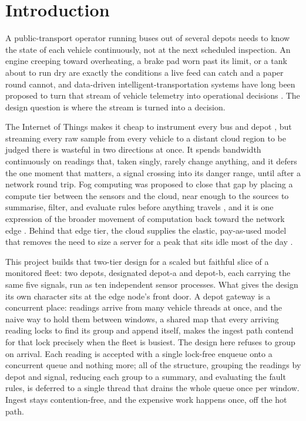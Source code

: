 \documentclass[conference]{IEEEtran}
\begin{document}
\section{Introduction}

A public-transport operator running buses out of several depots needs to know the state of each vehicle continuously, not at the next scheduled inspection. An engine creeping toward overheating, a brake pad worn past its limit, or a tank about to run dry are exactly the conditions a live feed can catch and a paper round cannot, and data-driven intelligent-transportation systems have long been proposed to turn that stream of vehicle telemetry into operational decisions \cite{zhang2011, killeen2019}. The design question is where the stream is turned into a decision.

The Internet of Things makes it cheap to instrument every bus and depot \cite{atzori2010}, but streaming every raw sample from every vehicle to a distant cloud region to be judged there is wasteful in two directions at once. It spends bandwidth continuously on readings that, taken singly, rarely change anything, and it defers the one moment that matters, a signal crossing into its danger range, until after a network round trip. Fog computing was proposed to close that gap by placing a compute tier between the sensors and the cloud, near enough to the sources to summarise, filter, and evaluate rules before anything travels \cite{bonomi2012, yousefpour2019}, and it is one expression of the broader movement of computation back toward the network edge \cite{shi2016, satyanarayanan2017}. Behind that edge tier, the cloud supplies the elastic, pay-as-used model that removes the need to size a server for a peak that sits idle most of the day \cite{armbrust2010}.

This project builds that two-tier design for a scaled but faithful slice of a monitored fleet: two depots, designated depot-a and depot-b, each carrying the same five signals, run as ten independent sensor processes. What gives the design its own character sits at the edge node's front door. A depot gateway is a concurrent place: readings arrive from many vehicle threads at once, and the naive way to hold them between windows, a shared map that every arriving reading locks to find its group and append itself, makes the ingest path contend for that lock precisely when the fleet is busiest. The design here refuses to group on arrival. Each reading is accepted with a single lock-free enqueue onto a concurrent queue and nothing more; all of the structure, grouping the readings by depot and signal, reducing each group to a summary, and evaluating the fault rules, is deferred to a single thread that drains the whole queue once per window. Ingest stays contention-free, and the expensive work happens once, off the hot path.
\end{document}
